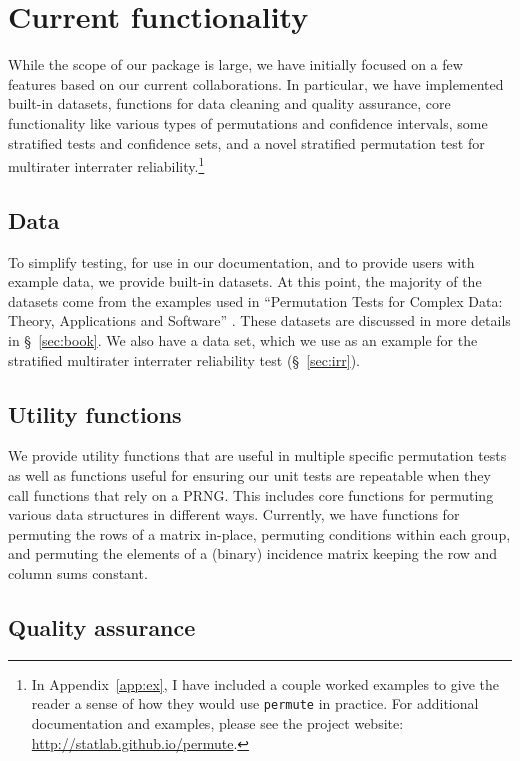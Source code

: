 \chapter{\label{ch:func}Current functionality}

While the scope of our package is large, we have initially focused on a few
features based on our current collaborations.  In particular, we have
implemented built-in datasets, functions for data cleaning and quality
assurance, core functionality like various types of permutations and confidence
intervals, some stratified tests and confidence sets, and a novel stratified
permutation test for multirater interrater reliability.\footnote{In
Appendix~\ref{app:ex}, I have included a couple worked examples to give the
reader a sense of how they would use \texttt{permute} in practice.  For
additional documentation and examples, please see the project website:
\url{http://statlab.github.io/permute}.}

\section{Data}

To simplify testing, for use in our documentation, and to provide users with
example data, we provide built-in datasets. At this point, the majority
of the datasets come from the examples used in ``Permutation Tests for Complex
Data: Theory, Applications and Software'' \cite{pesarin2010permutation}.  These
datasets are discussed in more details in \S~\ref{sec:book}.  We also have a
data set, which we use as an example for the stratified multirater interrater
reliability test (\S~\ref{sec:irr}).

\section{Utility functions}

We provide utility functions that are useful in multiple specific
permutation tests as well as functions useful for ensuring our unit tests are
repeatable when they call functions that rely on a PRNG.  This includes core
functions for permuting various data structures in different ways.  Currently,
we have functions for permuting the rows of a matrix in-place, permuting
conditions within each group, and permuting the elements of a (binary)
incidence matrix keeping the row and column sums constant.


\section{Quality assurance}

